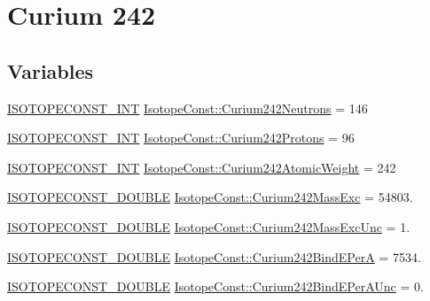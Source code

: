 \hypertarget{group___isotope_const-_curium-_cm242}{}\section{Curium 242}
\label{group___isotope_const-_curium-_cm242}
\subsection*{Variables}
\begin{DoxyCompactItemize}
\item 
\mbox{\hyperlink{group___isotope_const-_macros_ga5f18360b3e99483a35c32d789e62621c}{I\+S\+O\+T\+O\+P\+E\+C\+O\+N\+S\+T\+\_\+\+I\+NT}} \mbox{\hyperlink{group___isotope_const-_curium-_cm242_ga0febb8e93dffbef5273b5d922b48bf39}{Isotope\+Const\+::\+Curium242\+Neutrons}} = 146
\item 
\mbox{\hyperlink{group___isotope_const-_macros_ga5f18360b3e99483a35c32d789e62621c}{I\+S\+O\+T\+O\+P\+E\+C\+O\+N\+S\+T\+\_\+\+I\+NT}} \mbox{\hyperlink{group___isotope_const-_curium-_cm242_ga26c1cea8cb4c7073484d7bafb99b7c2c}{Isotope\+Const\+::\+Curium242\+Protons}} = 96
\item 
\mbox{\hyperlink{group___isotope_const-_macros_ga5f18360b3e99483a35c32d789e62621c}{I\+S\+O\+T\+O\+P\+E\+C\+O\+N\+S\+T\+\_\+\+I\+NT}} \mbox{\hyperlink{group___isotope_const-_curium-_cm242_gaaea41d7ce7da9f09d6c66ef2e4c37550}{Isotope\+Const\+::\+Curium242\+Atomic\+Weight}} = 242
\item 
\mbox{\hyperlink{group___isotope_const-_macros_ga8f45a7272ce02c0b4c65c44636ed719a}{I\+S\+O\+T\+O\+P\+E\+C\+O\+N\+S\+T\+\_\+\+D\+O\+U\+B\+LE}} \mbox{\hyperlink{group___isotope_const-_curium-_cm242_gaa50639efb8b02db9afeca566d6383153}{Isotope\+Const\+::\+Curium242\+Mass\+Exc}} = 54803.
\item 
\mbox{\hyperlink{group___isotope_const-_macros_ga8f45a7272ce02c0b4c65c44636ed719a}{I\+S\+O\+T\+O\+P\+E\+C\+O\+N\+S\+T\+\_\+\+D\+O\+U\+B\+LE}} \mbox{\hyperlink{group___isotope_const-_curium-_cm242_ga82d0027b2f4f6ab7704f4a45df6e7d96}{Isotope\+Const\+::\+Curium242\+Mass\+Exc\+Unc}} = 1.
\item 
\mbox{\hyperlink{group___isotope_const-_macros_ga8f45a7272ce02c0b4c65c44636ed719a}{I\+S\+O\+T\+O\+P\+E\+C\+O\+N\+S\+T\+\_\+\+D\+O\+U\+B\+LE}} \mbox{\hyperlink{group___isotope_const-_curium-_cm242_gaabe348310f75f6a88f179a2be4bc4879}{Isotope\+Const\+::\+Curium242\+Bind\+E\+PerA}} = 7534.
\item 
\mbox{\hyperlink{group___isotope_const-_macros_ga8f45a7272ce02c0b4c65c44636ed719a}{I\+S\+O\+T\+O\+P\+E\+C\+O\+N\+S\+T\+\_\+\+D\+O\+U\+B\+LE}} \mbox{\hyperlink{group___isotope_const-_curium-_cm242_gadaebc4b3d4e3f3cbd4e71d6b2f3c2c37}{Isotope\+Const\+::\+Curium242\+Bind\+E\+Per\+A\+Unc}} = 0.

\end{DoxyCompactItemize}
